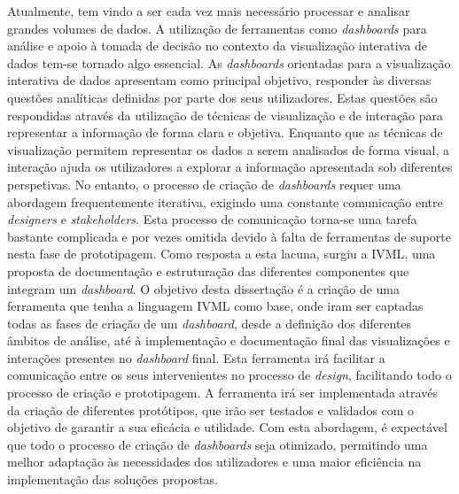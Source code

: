 
%

Atualmente, tem vindo a ser cada vez mais necessário processar e analisar grandes volumes de dados. A utilização de ferramentas como \textit{dashboards} para análise e apoio à tomada de decisão no contexto da visualização interativa de dados tem-se tornado algo essencial. As \textit{dashboards} orientadas para a visualização interativa de dados apresentam como principal objetivo, responder às diversas questões analíticas definidas por parte dos seus utilizadores. Estas questões são respondidas através da utilização de técnicas de visualização e de interação para representar a informação de forma clara e objetiva. Enquanto que as técnicas de visualização permitem representar os dados a serem analisados de forma visual, a interação ajuda os utilizadores a explorar a informação apresentada sob diferentes perspetivas. No entanto, o processo de criação de \textit{dashboards} requer uma abordagem frequentemente iterativa, exigindo uma constante comunicação entre \textit{designers} e \textit{stakeholders}. Esta processo de comunicação torna-se uma tarefa bastante complicada e por vezes omitida devido à falta de ferramentas de suporte nesta fase de prototipagem. Como resposta a esta lacuna, surgiu a \gls{IVML}, uma proposta de documentação e estruturação das diferentes componentes que integram um \textit{dashboard}. O objetivo desta dissertação é a criação de uma ferramenta que tenha a linguagem \gls{IVML} como base, onde iram ser captadas todas as fases de criação de um \textit{dashboard}, desde a definição dos diferentes âmbitos de análise, até à implementação e documentação final das visualizações e interações presentes no \textit{dashboard} final. Esta ferramenta irá facilitar a comunicação entre os seus intervenientes no processo de \textit{design}, facilitando todo o processo de criação e prototipagem. A ferramenta irá ser implementada através da criação de diferentes protótipos, que irão ser testados e validados com o objetivo de garantir a sua eficácia e utilidade. Com esta abordagem, é expectável que todo o processo de criação de \textit{dashboards} seja otimizado, permitindo uma melhor adaptação às necessidades dos utilizadores e uma maior eficiência na implementação das soluções propostas.

